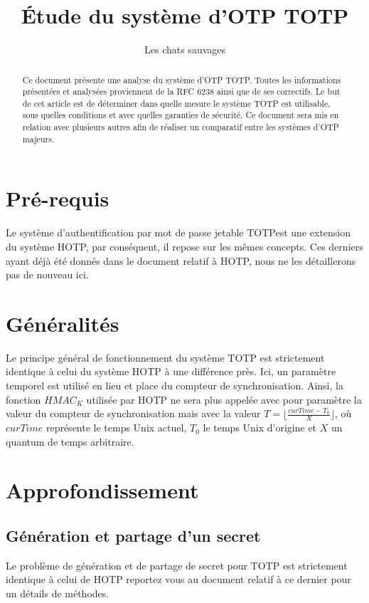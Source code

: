 \documentclass{../res/univ-projet}
\title{\'Etude du système d'OTP \og{}TOTP\fg{}}
\author{Les chats sauvages}
\begin{document}
\maketitle

\begin{abstract}
Ce document présente une analyse du système d'OTP \og{}TOTP\fg{}. Toutes les informations présentées et analysées proviennent de la RFC 6238 ainsi que de ses
correctifs. Le but de cet article est de déterminer dans quelle mesure le système TOTP est utilisable, sous quelles conditions et avec quelles garanties de sécurité.
Ce document sera mis en relation avec plusieurs autres afin de réaliser un comparatif entre les systèmes d'OTP majeurs.
\end{abstract}
\newpage
\tableofcontents
\newpage

\section{Pré-requis}
Le système d'authentification par mot de passe jetable \og{}TOTP\fg est une extension du système \og{}HOTP\fg{}, par conséquent, il repose sur les mêmes concepts. Ces 
derniers ayant déjà été donnés dans le document relatif à \og{}HOTP\fg{}, nous ne les détaillerons pas de nouveau ici.

\section{Généralités}
Le principe général de fonctionnement du système \og{}TOTP\fg{} est strictement identique à celui du système \og{}HOTP\fg{} à une différence près. Ici, un paramètre 
temporel est utilisé en lieu et place du compteur de synchronisation. Ainsi, la fonction $HMAC_K$ utilisée par \og{}HOTP\fg{} ne sera plus appelée avec pour paramètre la 
valeur du compteur de synchronisation mais avec la valeur $T = \lfloor{}\frac{curTime - T_0}{X}\rfloor{}$, où $curTime$ représente le temps Unix actuel, $T_0$ le temps Unix \og{}
d'origine\fg{} et $X$ un quantum de temps arbitraire.

\section{Approfondissement}
  \subsection{Génération et partage d'un secret}
    Le problème de génération et de partage de secret pour \og{}TOTP\fg{} est strictement identique à celui de \og{}HOTP\fg{} reportez vous au document relatif à ce 
    dernier pour un détails de méthodes.
    
\end{document}
